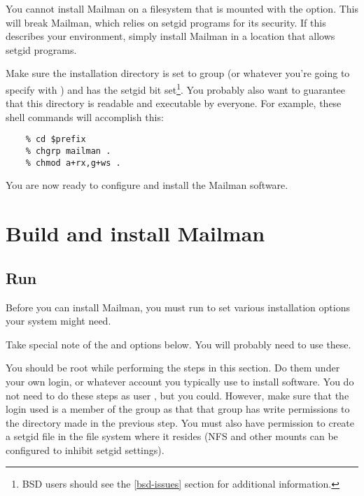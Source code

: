 \documentclass{howto}
\begin{document}
\begin{notice}[warning]
You cannot install Mailman on a filesystem that is mounted with the
 option.  This will break Mailman, which relies on setgid
programs for its security.  If this describes your environment, simply install
Mailman in a location that allows setgid programs.
\end{notice}

Make sure the installation directory is set to group  (or
whatever you're going to specify with ) and has
the setgid bit set\footnote{BSD users should see the \ref{bsd-issues} section
for additional information.}.  You probably also want to guarantee that this
directory is readable and executable by everyone.  For example, these shell
commands will accomplish this:

\begin{verbatim}
    % cd $prefix
    % chgrp mailman .
    % chmod a+rx,g+ws .
\end{verbatim}

You are now ready to configure and install the Mailman software.

\section{Build and install Mailman\label{building}}

\subsection{Run }

Before you can install Mailman, you must run  to set
various installation options your system might need.

\begin{notice}[note]
Take special note of the  and
 options below.  You will probably need to use
these.
\end{notice}

You should  be root while performing the steps in this section.
Do them under your own login, or whatever account you typically use to install
software.  You do not need to do these steps as user , but you
could.  However, make sure that the login used is a member of the
 group as that that group has write permissions to the
 directory made in the previous step.  You must also have
permission to create a setgid file in the file system where it resides (NFS
and other mounts can be configured to inhibit setgid settings).
\end{document}
